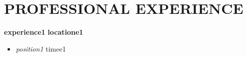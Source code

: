

\section{PROFESSIONAL EXPERIENCE}

\textbf{{experience1}} \hfill \textbf{{locatione1}}

\begin{itemize}

\item \textit{{position1}} \hfill {{timee1}}

\end{itemize}


